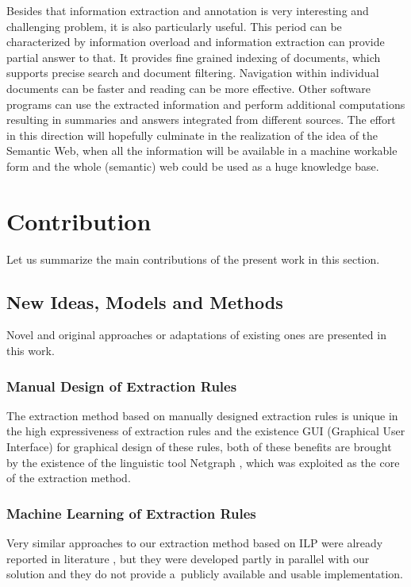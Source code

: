 \documentclass[12pt,a4paper,twoside,notitlepage]{article}
\begin{document}
Besides that information extraction and annotation is very interesting and challenging problem, it is also particularly useful. This period can be characterized by information overload and information extraction can provide partial answer to that. It provides fine grained indexing of documents, which supports precise search and document filtering. Navigation within individual documents can be faster and reading can be more effective. Other software programs can use the extracted information and perform additional computations resulting in summaries and answers integrated from different sources.  The effort in this direction will hopefully culminate in the realization of the idea of the Semantic Web, when all the information will be available in a machine workable form and the whole (semantic) web could be used as a huge knowledge base.



\section{Contribution} \label{sec:phd_contributions}

Let us summarize the main contributions of the present work in this section.

\subsection{New Ideas, Models and Methods}

Novel and original approaches or adaptations of existing ones are presented in this work.

\subsubsection{Manual Design of Extraction Rules}
The extraction method based on manually designed extraction rules is unique in the high expressiveness of extraction rules and the existence GUI (Graphical User Interface) for graphical design of these rules, both of these benefits are brought by the existence of the linguistic tool Netgraph \citep{biblio:MiNetgraphA2006}, which was exploited as the core of the extraction method.

\subsubsection{Machine Learning of Extraction Rules}
Very similar approaches to our extraction method based on ILP were already reported in literature \citep{DBLP:conf/ilp/RamakrishnanJBS07, aitken02:_learn_infor_extrac_rules}, but they were developed partly in parallel with our solution and they do not provide a~publicly available and usable implementation. 
\end{document}
